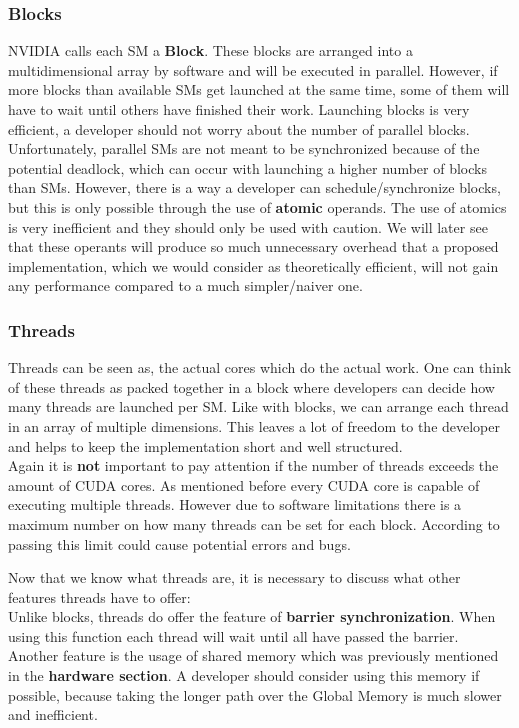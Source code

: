 \documentclass[draft, final]{vutinfth} %
\begin{document}
			\subsubsection{Blocks}
				NVIDIA calls each SM a \textbf{Block}. These blocks are arranged into a multidimensional array by software and will be executed in parallel. However, if more blocks than available SMs get launched at the same time, some of them will have to wait until others have finished their work. Launching blocks is very efficient, a developer should not worry about the number of parallel blocks.\\
				Unfortunately, parallel SMs are not meant to be synchronized because of the potential deadlock, which can occur with launching a higher number of blocks than SMs. However, there is a way a developer can schedule/synchronize blocks, but this is only possible through the use of \textbf{atomic} operands. The use of atomics is very inefficient and they should only be used with caution. We will later see that these operants will produce so much unnecessary overhead that a proposed implementation, which we would consider as theoretically efficient, will not gain any performance compared to a much simpler/naiver one.

			\subsubsection{Threads}
				Threads can be seen as, the actual cores which do the actual work. One can think of these threads as packed together in a block where developers can decide how many threads are launched per SM. Like with blocks, we can arrange each thread in an array of multiple dimensions. This leaves a lot of freedom to the developer and helps to keep the implementation short and well structured.\\
				Again it is \textbf{not} important to pay attention if the number of threads exceeds the amount of CUDA cores. As mentioned before every CUDA core is capable of executing multiple threads. However due to software limitations there is a maximum number on how many threads can be set for each block. According to \cite{Sanders:2010:CEI:1891996} passing this limit could cause potential errors and bugs.

				Now that we know what threads are, it is necessary to discuss what other features threads have to offer:\\
				Unlike blocks, threads do offer the feature of \textbf{barrier synchronization}. When using this function each thread will wait until all have passed the barrier.\\
				Another feature is the usage of shared memory which was previously mentioned in the \textbf{hardware section}. A developer should consider using this memory if possible, because taking the longer path over the Global Memory is much slower and inefficient.
\end{document}
